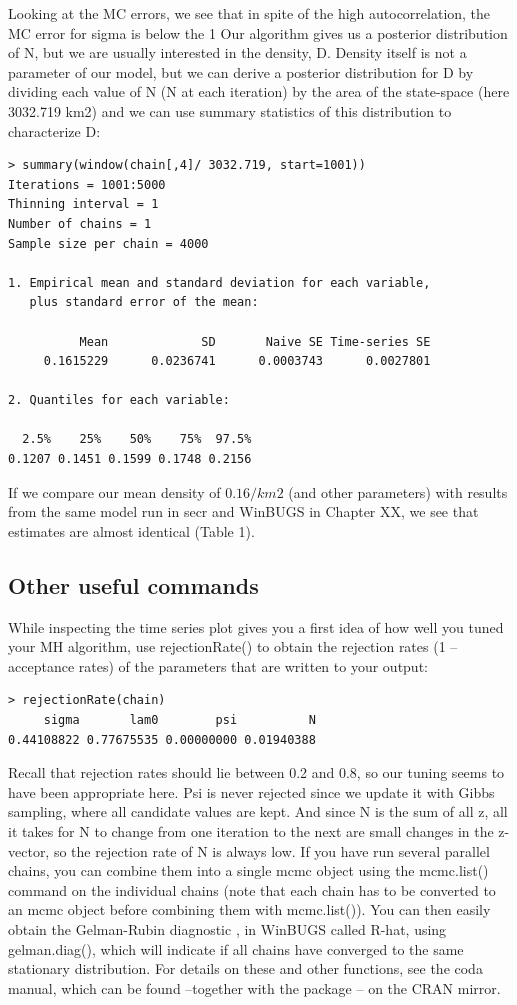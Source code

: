 Looking at the MC errors, we see that in spite of the high autocorrelation, the MC error for sigma is below the 1%
Our algorithm gives us a posterior distribution of N, but we are usually interested in the density, D. Density itself is not a parameter of our model, but we can derive a posterior distribution for D by dividing each value of N (N at each iteration) by the area of the state-space (here 3032.719 km2) and we can use summary statistics of this distribution to characterize D: 
\begin{verbatim}
> summary(window(chain[,4]/ 3032.719, start=1001))
Iterations = 1001:5000
Thinning interval = 1 
Number of chains = 1 
Sample size per chain = 4000 

1. Empirical mean and standard deviation for each variable,
   plus standard error of the mean:

          Mean             SD       Naive SE Time-series SE 
     0.1615229      0.0236741      0.0003743      0.0027801 

2. Quantiles for each variable:

  2.5%    25%    50%    75%  97.5% 
0.1207 0.1451 0.1599 0.1748 0.2156
\end{verbatim}
If we compare our mean density of $0.16/km2$ (and other parameters) with results from the same model run in secr and WinBUGS in Chapter XX, we see that estimates are almost identical (Table 1). 


\subsection{Other useful commands }
While inspecting the time series plot gives you a first idea of how well you tuned your MH algorithm, use rejectionRate() to obtain the rejection rates (1 – acceptance rates) of the parameters that are written to your output:
\begin{verbatim}
> rejectionRate(chain)
     sigma       lam0        psi          N 
0.44108822 0.77675535 0.00000000 0.01940388 
\end{verbatim}
 Recall that rejection rates should lie between 0.2 and 0.8, so our tuning seems to have been appropriate here. Psi is never rejected since we update it with Gibbs sampling, where all candidate values are kept. And since N is the sum of all z, all it takes for N to change from one iteration to the next are small changes in the z-vector, so the rejection rate of N is always low. 
If you have run several parallel chains, you can combine them into a single mcmc object using the mcmc.list() command on the individual chains (note that each chain has to be converted to an mcmc object before combining them with mcmc.list()). You can then easily obtain the Gelman-Rubin diagnostic \citep{gelman_etal:2004}, in WinBUGS called R-hat, using gelman.diag(), which will indicate if all chains have converged to the same stationary distribution.  
For details on these and other functions, see the coda manual, which can be found –together with the package – on the CRAN mirror.

